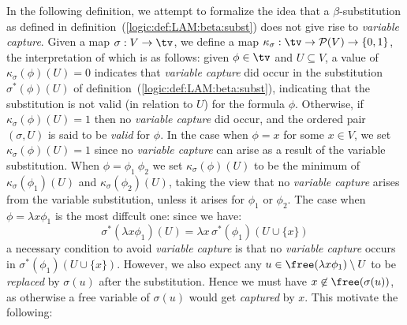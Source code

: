 In the following definition, we attempt to formalize the idea that a
$\beta$-substitution as defined in definition~(\ref{logic:def:LAM:beta:subst})
does not give rise to {\em variable capture}. Given a map $\sigma:V\to\tv$,
we define a map $\kappa_{\sigma}:\tv\to{\cal P}(V)\to\{0,1\}$, the
interpretation of which is as follows: given $\phi\in\tv$ and $U\subseteq V$, 
a value of $\kappa_{\sigma}(\phi)(U)=0$ indicates that {\em variable capture} 
did occur in the substitution $\sigma^{*}(\phi)(U)$ of
definition~(\ref{logic:def:LAM:beta:subst}), indicating that the substitution
is not valid (in relation to $U$) for the formula $\phi$. Otherwise,
if $\kappa_{\sigma}(\phi)(U)=1$ then no {\em variable capture} did occur,
and the ordered pair $(\sigma,U)$ is said to be {\em valid} for $\phi$.
In the case when $\phi=x$ for some $x\in V$, we set $\kappa_{\sigma}(\phi)
(U)=1$ since no {\em variable capture} can arise as a result of the variable
substitution. When $\phi=\phi_{1}\ \phi_{2}$ we set $\kappa_{\sigma}(\phi)(U)$
to be the minimum of $\kappa_{\sigma}(\phi_{1})(U)$ and $\kappa_{\sigma}
(\phi_{2})(U)$, taking the view that no {\em variable capture}
arises from the variable substitution, unless it arises for $\phi_{1}$ or 
$\phi_{2}$. The case when $\phi=\lambda x\phi_{1}$ is the most diffcult
one: since we have:
    \[
        \sigma^{*}(\lambda x \phi_{1})(U)
        =
        \lambda x \,\sigma^{*}(\phi_{1})(U\cup\{x\})
    \]
a necessary condition to avoid {\em variable capture} is that no {\em 
variable capture} occurs in $\sigma^{*}(\phi_{1})(U\cup\{x\})$. However,
we also expect any $u\in\free(\lambda x\phi_{1})\setminus U$ to be 
{\em replaced} by $\sigma(u)$ after the substitution. Hence we must have
$x\not\in\free(\sigma(u))$, as otherwise a free variable of $\sigma(u)$
would get {\em captured} by $x$. This motivate the following:
